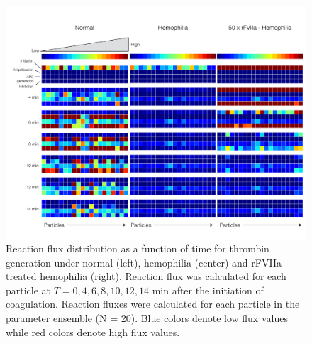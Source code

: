 \documentclass[12pt]{article}
\begin{document}
\begin{figure}
\centering
\includegraphics[width=1.0\textwidth]{./figs/Figure-8-Flux-rFVIIa-Trigger.pdf}
\caption{Reaction flux distribution as a function of time for thrombin generation under normal (left), hemophilia (center) and rFVIIa treated hemophilia (right).
Reaction flux was calculated for each particle at $T = 0,4,6,8,10,12,14$ min after the initiation of coagulation. 
Reaction fluxes were calculated for each particle in the parameter ensemble (N = 20).
Blue colors denote low flux values while red colors denote high flux values.}\label{fig-flux-analysis}
\end{figure}

\clearpage
\end{document}
